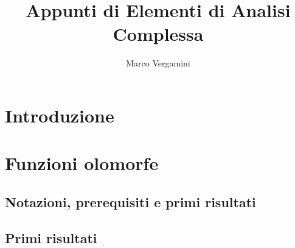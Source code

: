 \documentclass{article}
\title{Appunti di Elementi di Analisi Complessa}
\date{}
\author{Marco Vergamini}
\begin{document}
\maketitle
\newpage
\tableofcontents
\newpage


\section{Introduzione}


\newpage

\section{Funzioni olomorfe}

\subsection{Notazioni, prerequisiti e primi risultati}


\subsection{Primi risultati}

\end{document}
